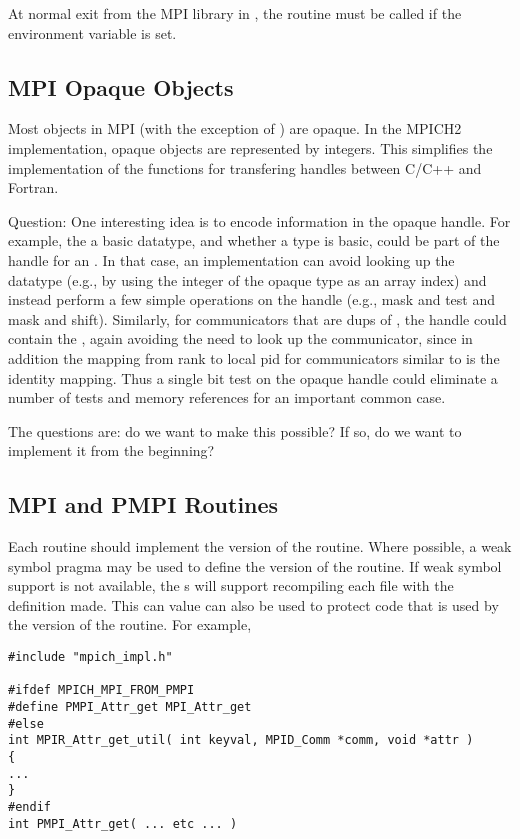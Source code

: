 \documentclass{article}
\begin{document}
At normal exit from the MPI library in , the
routine  must be called if the environment variable
 is set.  

\subsection{MPI Opaque Objects}

Most objects in MPI (with the exception of ) are
opaque.  In the MPICH2 implementation, opaque objects are represented
by integers.  This simplifies the implementation of the functions for
transfering handles between C/C++ and Fortran.  

Question:  One interesting idea is to encode information in the opaque
handle.  For example, the  a basic datatype, and whether
a type is basic, could be part of the handle for an
. In that case, an implementation can avoid looking
up the datatype (e.g., by using the integer of the opaque type as an
array index) and instead perform a few simple operations on the handle
(e.g., mask and test and mask and shift).  Similarly, for
communicators that are dups of , the handle could
contain the , again avoiding the need to look up the
communicator, since in addition the mapping from rank to local pid for 
communicators similar to  is the identity
mapping.  Thus a single bit test on the opaque handle could eliminate
a number of tests and memory references for an important common case.

The questions are: do we want to make this possible?  If so, do we
want to implement it from the beginning?

\subsection{MPI and PMPI Routines}
Each routine should implement the  version of the routine.
Where possible, a weak symbol pragma may be used to define the
 version of the routine.  If weak symbol support is not
available, the s will support recompiling each file
with the definition  made.  This can value
can also be used to protect code that is used by the 
version of the routine.  For example, 
\begin{verbatim}
#include "mpich_impl.h"

#ifdef MPICH_MPI_FROM_PMPI
#define PMPI_Attr_get MPI_Attr_get
#else
int MPIR_Attr_get_util( int keyval, MPID_Comm *comm, void *attr )
{
...
}
#endif
int PMPI_Attr_get( ... etc ... )
\end{verbatim}
\end{document}
